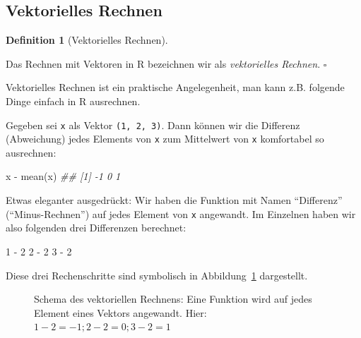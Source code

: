 \documentclass[
  letterpaper,
  twoside,
  open=any]{scrbook}
\newenvironment{Shaded}{\begin{snugshade}}{\end{snugshade}}
\newcommand{\DecValTok}[1]{\textcolor[rgb]{0.68,0.00,0.00}{#1}}
\newcommand{\DocumentationTok}[1]{\textcolor[rgb]{0.37,0.37,0.37}{\textit{#1}}}
\newcommand{\FunctionTok}[1]{\textcolor[rgb]{0.28,0.35,0.67}{#1}}
\newcommand{\NormalTok}[1]{\textcolor[rgb]{0.00,0.23,0.31}{#1}}
\newcommand{\SpecialCharTok}[1]{\textcolor[rgb]{0.37,0.37,0.37}{#1}}
\theoremstyle{definition}
\theoremstyle{definition}
\theoremstyle{definition}
\newtheorem{definition}{Definition}[chapter]
\theoremstyle{remark}
\begin{document}
\subsection{Vektorielles Rechnen}\label{sec-veccalc}

\begin{definition}[Vektorielles
Rechnen]\protect\hypertarget{def-veccalc}{}\label{def-veccalc}

Das Rechnen mit Vektoren in R bezeichnen wir als \emph{vektorielles
Rechnen}. \(\square\)

\end{definition}

Vektorielles Rechnen ist ein praktische Angelegenheit, man kann z.B.
folgende Dinge einfach in R ausrechnen.

Gegeben sei \texttt{x} als Vektor \texttt{(1,\ 2,\ 3)}. Dann können wir
die Differenz (Abweichung) jedes Elements von \texttt{x} zum Mittelwert
von \texttt{x} komfortabel so ausrechnen:

\begin{Shaded}
\begin{Highlighting}[]
\NormalTok{x }\SpecialCharTok{{-}} \FunctionTok{mean}\NormalTok{(x)}
\DocumentationTok{\#\# [1] {-}1  0  1}
\end{Highlighting}
\end{Shaded}

Etwas eleganter ausgedrückt: Wir haben die Funktion mit Namen
\enquote{Differenz} (\enquote{Minus-Rechnen}) auf jedes Element von
\texttt{x} angewandt. Im Einzelnen haben wir also folgenden drei
Differenzen berechnet:

\begin{Shaded}
\begin{Highlighting}[]
\DecValTok{1} \SpecialCharTok{{-}} \DecValTok{2}
\DecValTok{2} \SpecialCharTok{{-}} \DecValTok{2}
\DecValTok{3} \SpecialCharTok{{-}} \DecValTok{2}
\end{Highlighting}
\end{Shaded}

Diese drei Rechenschritte sind symbolisch in
Abbildung~\ref{fig-vektoriell} dargestellt.

\begin{figure}


\caption{\label{fig-vektoriell}Schema des vektoriellen Rechnens: Eine
Funktion wird auf jedes Element eines Vektors angewandt. Hier:
\(1-2=-1; 2-2=0; 3-2=1\)}

\end{figure}%
\end{document}
